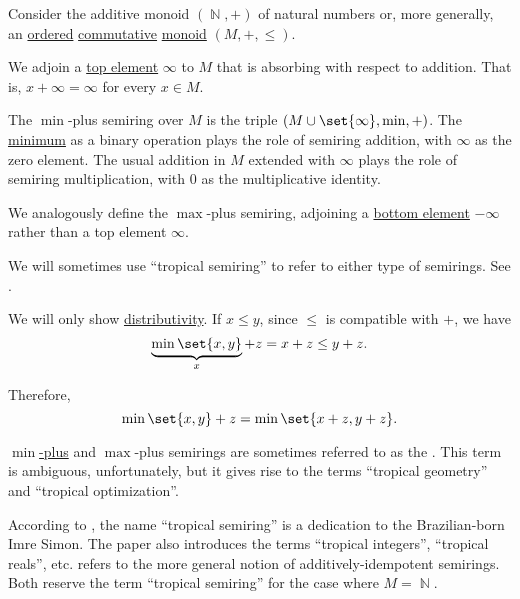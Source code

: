 \begin{definition}\label{def:tropical_semiring}
  Consider the additive monoid \( (\BbbN, +) \) of natural numbers or, more generally, an \hyperref[def:ordered_magma]{ordered} \hyperref[def:magma/commutative]{commutative} \hyperref[def:monoid]{monoid} \( (M, +, \leq) \).

  We adjoin a \hyperref[def:partially_ordered_set_extremal_points/top_and_bottom]{top element} \( \infty \) to \( M \) that is absorbing with respect to addition. That is, \( x + \infty = \infty \) for every \( x \in M \).

  The \( \min \)-plus semiring over \( M \) is the triple \( (M \cup \set{ \infty }, \min, +) \). The \hyperref[def:partially_ordered_set_extremal_points/maximum_and_minimum]{minimum} as a binary operation plays the role of semiring addition, with \( \infty \) as the zero element. The usual addition in \( M \) extended with \( \infty \) plays the role of semiring multiplication, with \( 0 \) as the multiplicative identity.

  We analogously define the \( \max \)-plus semiring, adjoining a \hyperref[def:partially_ordered_set_extremal_points/top_and_bottom]{bottom element} \( -\infty \) rather than a top element \( \infty \).

  We will sometimes use \enquote{tropical semiring} to refer to either type of semirings. See .
\end{definition}
\begin{defproof}
  We will only show \hyperref[def:semiring/left_distributivity]{distributivity}. If \( x \leq y \), since \( \leq \) is compatible with \( + \), we have
  \begin{equation*}
    \underbrace{\min\set{ x, y }}_{x} + z = x + z \leq y + z.
  \end{equation*}

  Therefore,
  \begin{equation*}
    \min\set{ x, y } + z = \min\set{ x + z , y + z }.
  \end{equation*}
\end{defproof}

\begin{remark}\label{rem:tropical_semiring_etymology}
  \hyperref[def:tropical_semiring]{\( \min \)-plus} and \( \max \)-plus semirings are sometimes referred to as the . This term is ambiguous, unfortunately, but it gives rise to the terms \enquote{tropical geometry} and \enquote{tropical optimization}.

  According to \cite{Pin1994}, the name \enquote{tropical semiring} is a dedication to the Brazilian-born Imre Simon. The paper also introduces the terms \enquote{tropical integers}, \enquote{tropical reals}, etc. \cite[3]{Golan2010} refers to the more general notion of additively-idempotent semirings. Both reserve the term \enquote{tropical semiring} for the case where \( M = \BbbN \).
\end{remark}

